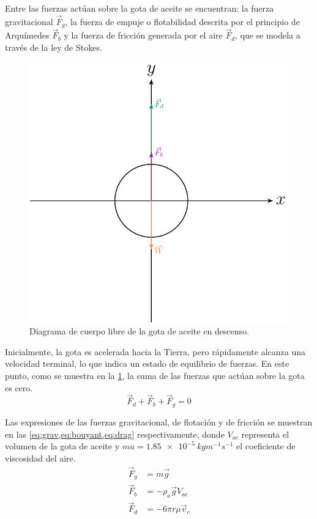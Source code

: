 Entre las fuerzas actúan sobre la gota de aceite se encuentran: la fuerza
gravitacional $\vec{F}_g$, la fuerza de empuje o flotabilidad descrita
por el principio de Arquímedes $\vec{F}_b$ y la fuerza de fricción generada
por el aire $\vec{F}_d$, que se modela a través de la ley de Stokes.

\begin{figure}[htbp!]
    \centering
    \includegraphics[width=0.8\linewidth]{./images/free-body-diagram-falling.pdf}
    \caption{Diagrama de cuerpo libre de la gota de aceite en descenso.}
    \label{fig:fbd-falling-drop}
\end{figure}

Inicialmente, la gota es acelerada hacia la Tierra, pero rápidamente
alcanza una velocidad terminal, lo que indica un estado de equilibrio de fuerzas.
En este punto, como se muestra en la \cref{fig:fbd-falling-drop}, la suma de
las fuerzas que actúan sobre la gota es cero.
\begin{equation}\label{eq:equilibrium-1}
    \vec{F}_d + \vec{F}_b + \vec{F}_g = 0
\end{equation}

Las expresiones de las fuerzas gravitacional, de flotación y de fricción se
muestran en las \cref{eq:grav,eq:bouyant,eq:drag} respectivamente, donde
\( V_{ac} \) representa el volumen de la gota de aceite y
\( mu = \qty{1.85e-5}{kgm^{-1}s^{-1}} \) el coeficiente de viscosidad del aire.
\begin{align}
    \vec{F}_g &= m\vec{g} \label{eq:grav} \\
    \vec{F}_b &= -\rho_a \vec{g}V_{ac} \label{eq:bouyant} \\
    \vec{F}_d &= -6\pi r\mu \vec{v}_c \label{eq:drag}
\end{align}

